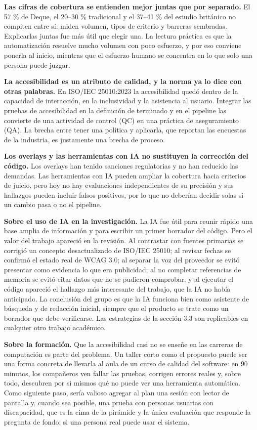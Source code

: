 \documentclass[10pt,letterpaper,onecolumn]{IEEEtran}
\begin{document}
\textbf{Las cifras de cobertura se entienden mejor juntas que por separado.} El 57 \% de Deque, el 20--30 \% tradicional y el 37--41 \% del estudio británico no compiten entre sí: miden volumen, tipos de criterio y barreras sembradas. Explicarlas juntas fue más útil que elegir una. La lectura práctica es que la automatización resuelve mucho volumen con poco esfuerzo, y por eso conviene ponerla al inicio, mientras que el esfuerzo humano se concentra en lo que solo una persona puede juzgar.

\textbf{La accesibilidad es un atributo de calidad, y la norma ya lo dice con otras palabras.} En ISO/IEC 25010:2023 la accesibilidad quedó dentro de la capacidad de interacción, en la inclusividad y la asistencia al usuario. Integrar las pruebas de accesibilidad en la definición de terminado y en el pipeline las convierte de una actividad de control (QC) en una práctica de aseguramiento (QA). La brecha entre tener una política y aplicarla, que reportan las encuestas de la industria, es justamente una brecha de proceso.

\textbf{Los overlays y las herramientas con IA no sustituyen la corrección del código.} Los overlays han tenido sanciones regulatorias y no han reducido las demandas. Las herramientas con IA pueden ampliar la cobertura hacia criterios de juicio, pero hoy no hay evaluaciones independientes de su precisión y sus hallazgos pueden incluir falsos positivos, por lo que no deberían decidir solas si un cambio pasa o no el pipeline.

\textbf{Sobre el uso de IA en la investigación.} La IA fue útil para reunir rápido una base amplia de información y para escribir un primer borrador del código. Pero el valor del trabajo apareció en la revisión. Al contrastar con fuentes primarias se corrigió un concepto desactualizado de ISO/IEC 25010; al revisar fechas se confirmó el estado real de WCAG 3.0; al separar la voz del proveedor se evitó presentar como evidencia lo que era publicidad; al no completar referencias de memoria se evitó citar datos que no se pudieron comprobar; y al ejecutar el código apareció el hallazgo más interesante del trabajo, que la IA no había anticipado. La conclusión del grupo es que la IA funciona bien como asistente de búsqueda y de redacción inicial, siempre que el producto se trate como un borrador que debe verificarse. Las estrategias de la sección 3.3 son replicables en cualquier otro trabajo académico.

\textbf{Sobre la formación.} Que la accesibilidad casi no se enseñe en las carreras de computación es parte del problema. Un taller corto como el propuesto puede ser una forma concreta de llevarla al aula de un curso de calidad del software: en 90 minutos, los compañeros ven fallar las pruebas, corrigen errores reales y, sobre todo, descubren por sí mismos qué no puede ver una herramienta automática. Como siguiente paso, sería valioso agregar al plan una sesión con lector de pantalla y, cuando sea posible, una prueba con personas usuarias con discapacidad, que es la cima de la pirámide y la única evaluación que responde la pregunta de fondo: si una persona real puede usar el sistema.
\end{document}
